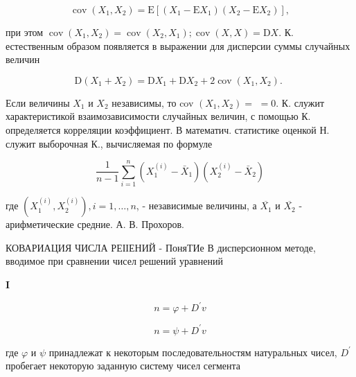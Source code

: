 \documentclass[10pt]{article}
\begin{document}
\[

\operatorname{cov}\left(X_{1}, X_{2}\right)=\mathrm{E}\left[\left(X_{1}-\mathrm{E} X_{1}\right)\left(X_{2}-\mathrm{E} X_{2}\right)\right],

\]



при этом $\operatorname{cov}\left(X_{1}, X_{2}\right)=\operatorname{cov}\left(X_{2}, X_{1}\right) ; \operatorname{cov}(X, X)=\mathrm{D} X$. К. естественным образом появляется в выражении для дисперсии суммы случайных величин



\[

\mathrm{D}\left(X_{1}+X_{2}\right)=\mathrm{D} X_{1}+\mathrm{D} X_{2}+2 \operatorname{cov}\left(X_{1}, X_{2}\right) \text {. }

\]



Если величины $X_{1}$ и $X_{2}$ независимы, то cov $\left(X_{1}, X_{2}\right)=$ $=0$. К. служит характеристикой взаимозависимости случайных величин, с помощью К. определяется корреляции коэффициент. В математич. статистике оценкой Н. служит выборочная К., вычисляемая по формуле



\[

\frac{1}{n-1} \sum_{i=1}^{n}\left(X_{1}^{(i)}-\bar{X}_{1}\right)\left(X_{2}^{(i)}-\bar{X}_{2}\right)

\]



где $\left(X_{1}^{(i)}, X_{2}^{(i)}\right), i=1, \ldots, n$, - независимые величины, а $\overline{X_{1}}$ и $\overline{X_{2}}$ - арифметические средние. $А$. В. Прохоров.



КОВАРИАЦИЯ ЧИСЛА РЕІІЕНИЙ - ПоняТИе В дисперсионном методе, вводимое при сравнении чисел решений уравнений



$\mathbf{I}$



\[

n=\varphi+D^{\prime} v

\]



\[

n=\psi+D^{\prime} v

\]



где $\varphi$ и $\psi$ принадлежат к некоторым последовательностям натуральных чисел, $D^{\prime}$ пробегает некоторую заданную систему чисел сегмента
\end{document}
